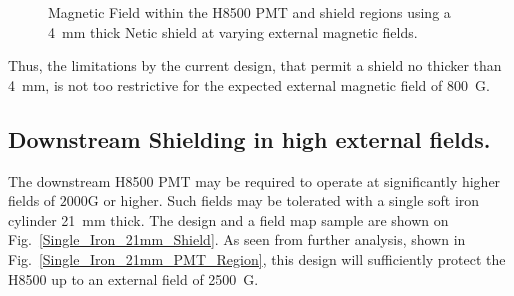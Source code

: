 \documentclass[12pt]{article}
\begin{document}
\begin{figure}[ht]
\centering
{}
\qquad
{}
\caption{\small{Magnetic Field within the H8500 PMT and shield regions using a 4~mm thick Netic shield at varying external magnetic fields.}}\label{Upstream_NETIC_4mm}
\end{figure}
%
Thus, the limitations by the current design, 
that permit a shield no thicker than 4~mm, is not too restrictive for the expected 
external magnetic field of 800~G.



\subsection{Downstream Shielding in high  external fields.}

The downstream H8500 PMT may be required to operate at significantly 
higher fields of $2000$G or higher.  Such fields may be tolerated with  a single  soft 
iron cylinder 21~mm thick. The design and a field map sample are  shown on 
Fig.~\ref{Single_Iron_21mm_Shield}. 
As seen from further analysis, shown in  Fig.~\ref{Single_Iron_21mm_PMT_Region},
this design  will sufficiently protect the H8500 up to an external field of 2500~G.  
\end{document}
